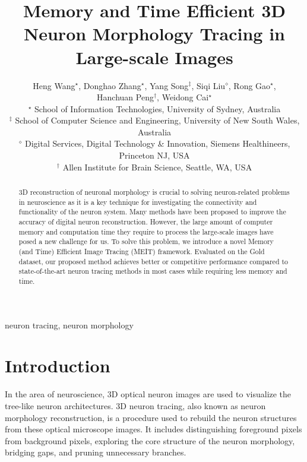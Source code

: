 \documentclass[conference]{IEEEtran}
\begin{document}
\title{Memory and Time Efficient 3D Neuron Morphology Tracing in Large-scale Images\\
}

\author{
Heng Wang$^{\star}$, Donghao Zhang$^{\star}$, Yang Song$^{\ddagger}$, Siqi Liu$^{\diamond}$, Rong Gao$^{\star}$,\\ Hanchuan Peng$^{\dagger}$, Weidong Cai$^{\star}$\\
$^{\star}$ School of Information Technologies, University of Sydney, Australia\\
$^{\ddagger}$ School of Computer Science and Engineering, University of New South Wales, Australia\\
$^{\diamond}$  Digital Services, Digital Technology \& Innovation, Siemens Healthineers, Princeton NJ, USA\\
$^{\dagger}$ Allen Institute for Brain Science, Seattle, WA, USA\\

}

\maketitle




\begin{abstract}
3D reconstruction of neuronal morphology is crucial to solving neuron-related problems in neuroscience as it is a key technique for investigating the connectivity and functionality of the neuron system. Many methods have been proposed to improve the accuracy of digital neuron reconstruction. However, the large amount of computer memory and computation time they require to process the large-scale images have posed a new challenge for us. To solve this problem, we introduce a novel Memory (and Time) Efficient Image Tracing (MEIT) framework. Evaluated on the Gold dataset, our proposed method achieves better or competitive performance compared to state-of-the-art neuron tracing methods in most cases while requiring less memory and time.
\end{abstract}

\begin{IEEEkeywords}
neuron tracing, neuron morphology
\end{IEEEkeywords}



\section{Introduction}
\label{sec:intro}
In the area of neuroscience, 3D optical neuron images are used to visualize the tree-like neuron architectures. 3D neuron tracing, also known as neuron morphology reconstruction, is a procedure used to rebuild the neuron structures from these optical microscope images. It includes distinguishing foreground pixels from background pixels, exploring the core structure of the neuron morphology, bridging gaps, and pruning unnecessary branches\cite{tracing_step}.
\end{document}

